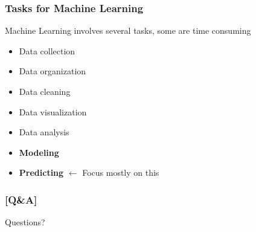\documentclass[xcolor=x11names,compress, aspectratio=169]{beamer}
\renewcommand{\(}{\begin{columns}}
\renewcommand{\)}{\end{columns}}
\newcommand{\<}[1]{\begin{column}{#1}}
\renewcommand{\>}{\end{column}}
\begin{document}
\begin{frame}
\frametitle{\textcolor{brique}{ Tasks for Machine Learning }}
Machine Learning involves several tasks, some are time consuming
\pause
\begin{itemize}[<+->]
    \item Data collection
    \item Data organization
    \item Data cleaning
    \item Data visualization
    \item Data analysis
    \item \textbf{Modeling}
    \item \textbf{Predicting} $\leftarrow$ Focus mostly on this
\end{itemize}
\end{frame}

\begin{frame} %
\frametitle{\textcolor{brique}{[Q\&A]}}
\begin{center}
\Large \textcolor{siap}{ Questions?}
\end{center}

\end{frame}
\end{document}
